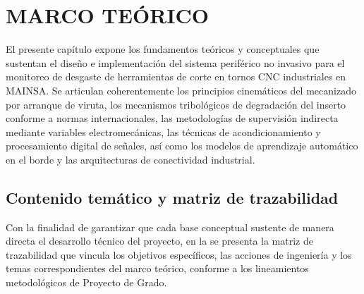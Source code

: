 \newpage
\section{MARCO TEÓRICO}

El presente capítulo expone los fundamentos teóricos y conceptuales que sustentan el diseño e implementación del sistema periférico no invasivo para el monitoreo de desgaste de herramientas de corte en tornos CNC industriales en MAINSA. Se articulan coherentemente los principios cinemáticos del mecanizado por arranque de viruta, los mecanismos tribológicos de degradación del inserto conforme a normas internacionales, las metodologías de supervisión indirecta mediante variables electromecánicas, las técnicas de acondicionamiento y procesamiento digital de señales, así como los modelos de aprendizaje automático en el borde y las arquitecturas de conectividad industrial.

\subsection{Contenido temático y matriz de trazabilidad}
Con la finalidad de garantizar que cada base conceptual sustente de manera directa el desarrollo técnico del proyecto, en la  se presenta la matriz de trazabilidad que vincula los objetivos específicos, las acciones de ingeniería y los temas correspondientes del marco teórico, conforme a los lineamientos metodológicos de Proyecto de Grado.

